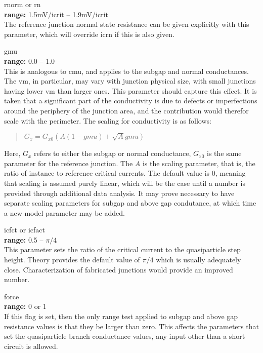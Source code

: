 \begin{description}
\item{{\vt rnorm} or {\vt rn}}\\
{\bf range:} 1.5mV/{\vt icrit} -- 1.9mV/{\vt icrit}\\
The reference junction normal state resistance can be given explicitly
with this parameter, which will override {\vt icrn} if this is also
given.

\item{\vt gmu}\\
{\bf range:} 0.0 -- 1.0\\
This is analogous to {\vt cmu}, and applies to the subgap and normal
conductances.  The {\vt vm}, in particular, may vary with junction
physical size, with small junctions having lower {\vt vm} than larger
ones.  This parameter should capture this effect.  It is taken that a
significant part of the conductivity is due to defects or
imperfections around the periphery of the junction area, and the
contribution would therefor scale with the perimeter.  The scaling for
conductivity is as follows:
\begin{quote}
$G_x = G_{x0} (A(1-gmu) + \sqrt{A} gmu)$
\end{quote}
Here, $G_x$ refers to either the subgap or normal conductance,
$G_{x0}$ is the same parameter for the reference junction.  The $A$ is
the scaling parameter, that is, the ratio of instance to reference
critical currents.  The default value is 0, meaning that scaling is
assumed purely linear, which will be the case until a number is
provided through additional data analysis.  It may prove necessary to
have separate scaling parameters for subgap and above gap condutance,
at which time a new model parameter may be added.

\item{{\vt icfct} or {\vt icfact}}\\
{\bf range:} 0.5 -- ${\pi}/4$\\
This parameter sets the ratio of the critical current to the
quasiparticle step height.  Theory provides the default value of
$\pi/4$ which is usually adequately close.  Characterization of
fabricated junctions would provide an improved number.

\item{\vt force}\\
{\bf range:} 0 or 1\\
If this flag is set, then the only range test applied to subgap and
above gap resistance values is that they be larger than zero.  This
affects the parameters that set the quasiparticle branch conductance
values, any input other than a short circuit is allowed.


\end{description}
